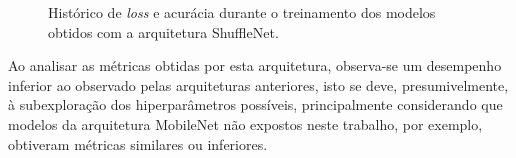 \begin{figure}[H]
\centering
\caption{Histórico de \emph{loss} e acurácia durante o treinamento dos modelos obtidos com a arquitetura ShuffleNet.}
\label{fig:treinamento-shufflenet}
\hfill
{}
\hfill
{}
\hfill
{}
\end{figure}

Ao analisar as métricas obtidas por esta arquitetura, observa-se um desempenho inferior ao observado pelas arquiteturas anteriores, isto se deve, presumivelmente, à subexploração dos hiperparâmetros possíveis, principalmente considerando que modelos da arquitetura MobileNet não expostos neste trabalho, por exemplo, obtiveram métricas similares ou inferiores.

